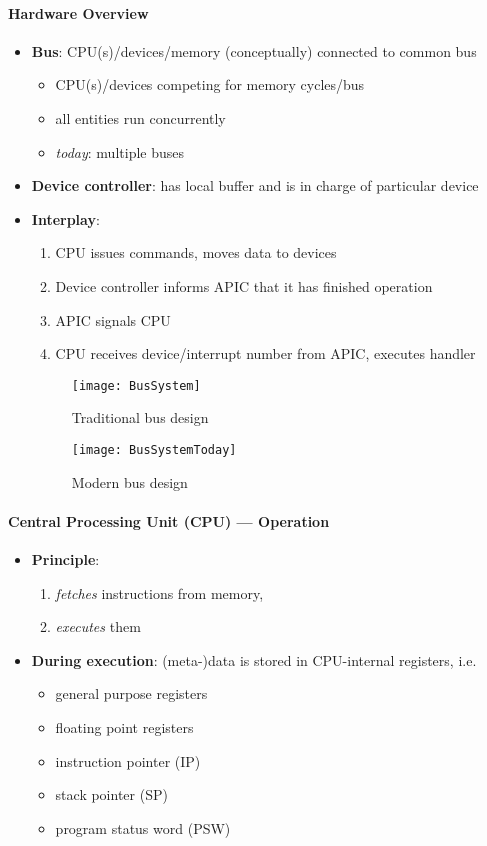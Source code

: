 \paragraph{Hardware Overview}
\begin{itemize}
	\item \textbf{Bus}: CPU(s)/devices/memory (conceptually) connected to common bus
	\begin{itemize}
		\item CPU(s)/devices competing for memory cycles/bus
		\item all entities run concurrently
		\item \emph{today}: multiple buses
	\end{itemize}
	\item \textbf{Device controller}: has local buffer and is in charge of particular device
	\item \textbf{Interplay}:
	\begin{enumerate}
		\item CPU issues commands, moves data to devices
		\item Device controller informs APIC that it has finished operation
		\item APIC signals CPU
		\item CPU receives device/interrupt number from APIC, executes handler 
	\end{enumerate}
	\begin{figure}[h]\centering\label{BusSystem}\texttt{[image: BusSystem]}\caption{Traditional bus design}\end{figure}
	\begin{figure}[h]\centering\label{BusSystemToday}\texttt{[image: BusSystemToday]}\caption{Modern bus design}\end{figure}
\end{itemize}

\paragraph{Central Processing Unit (CPU) --- Operation}
\begin{itemize}
	\item \textbf{Principle}:
	\begin{enumerate}
		\item \emph{fetches} instructions from memory,
		\item \emph{executes} them
	\end{enumerate}
	\item \textbf{During execution}: (meta-)data is stored in CPU-internal registers, i.e.
	\begin{itemize}
	 	\item general purpose registers
	 	\item floating point registers
	 	\item instruction pointer (IP)
	 	\item stack pointer (SP)
	 	\item program status word (PSW)
	 \end{itemize}
\end{itemize}

